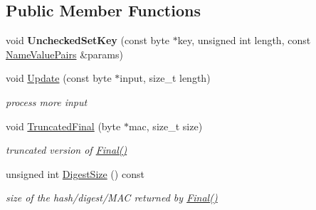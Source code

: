 \subsection*{Public Member Functions}
\begin{DoxyCompactItemize}
\item 
\hypertarget{class_c_b_c___m_a_c___base_ae20a7dda2bc350e34de851dee4ff81ea}{
void {\bfseries UncheckedSetKey} (const byte $\ast$key, unsigned int length, const \hyperlink{class_name_value_pairs}{NameValuePairs} \&params)}
\label{class_c_b_c___m_a_c___base_ae20a7dda2bc350e34de851dee4ff81ea}

\item 
\hypertarget{class_c_b_c___m_a_c___base_af4b9ad28defd9ff98d86f0d6de2f4cf0}{
void \hyperlink{class_c_b_c___m_a_c___base_af4b9ad28defd9ff98d86f0d6de2f4cf0}{Update} (const byte $\ast$input, size\_\-t length)}
\label{class_c_b_c___m_a_c___base_af4b9ad28defd9ff98d86f0d6de2f4cf0}

\begin{DoxyCompactList}\small\item\em process more input \item\end{DoxyCompactList}\item 
\hypertarget{class_c_b_c___m_a_c___base_a50c5a8fc6a2926485295bbe72bcfe4d8}{
void \hyperlink{class_c_b_c___m_a_c___base_a50c5a8fc6a2926485295bbe72bcfe4d8}{TruncatedFinal} (byte $\ast$mac, size\_\-t size)}
\label{class_c_b_c___m_a_c___base_a50c5a8fc6a2926485295bbe72bcfe4d8}

\begin{DoxyCompactList}\small\item\em truncated version of \hyperlink{class_hash_transformation_aa0b8c7a110d8968268fd02ec32b9a8e8}{Final()} \item\end{DoxyCompactList}\item 
\hypertarget{class_c_b_c___m_a_c___base_abc27c4dd1b795319a6a30c70f038f614}{
unsigned int \hyperlink{class_c_b_c___m_a_c___base_abc27c4dd1b795319a6a30c70f038f614}{DigestSize} () const }
\label{class_c_b_c___m_a_c___base_abc27c4dd1b795319a6a30c70f038f614}

\begin{DoxyCompactList}\small\item\em size of the hash/digest/MAC returned by \hyperlink{class_hash_transformation_aa0b8c7a110d8968268fd02ec32b9a8e8}{Final()} \item\end{DoxyCompactList}\end{DoxyCompactItemize}
